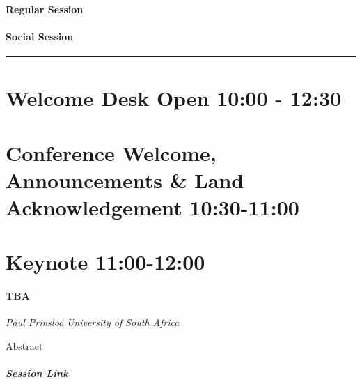 \documentclass[
]{book}
\begin{document}
\begin{session}
\hypertarget{regular-session}{%
\paragraph{Regular Session}\label{regular-session}}
\end{session}

\begin{social}
\hypertarget{social-session}{%
\paragraph{Social Session}\label{social-session}}
\end{social}

\begin{center}\rule{0.5\linewidth}{0.5pt}\end{center}

\hypertarget{welcome-desk-open-1000---1230}{%
\section*{Welcome Desk Open \textbar{} 10:00 - 12:30}\label{welcome-desk-open-1000---1230}}

\hypertarget{conference-welcome-announcements-land-acknowledgement-1030-1100}{%
\section*{Conference Welcome, Announcements \& Land Acknowledgement \textbar{} 10:30-11:00}\label{conference-welcome-announcements-land-acknowledgement-1030-1100}}

\hypertarget{keynote-1100-1200-2}{%
\section*{Keynote \textbar{} 11:00-12:00}\label{keynote-1100-1200-2}}

\begin{keynote}
 \hypertarget{tba}{%
 \paragraph*{TBA}\label{tba}}
 
 \emph{Paul Prinsloo} \emph{University of South Africa}
 
 Abstract
 
 \hypertarget{session-link}{%
 \subparagraph*{\texorpdfstring{\href{}{Session
 Link}}{Session Link}}\label{session-link}}
 \end{keynote}
\end{document}

